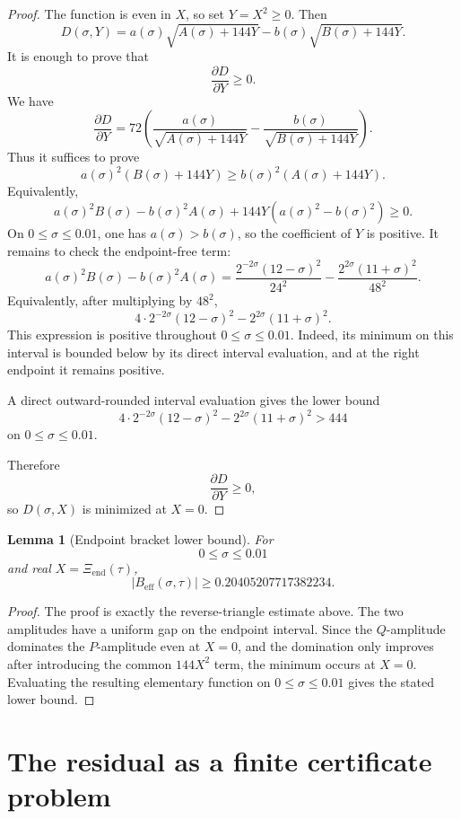 \documentclass[11pt]{article}
\newtheorem{lemma}[theorem]{Lemma}
\newcommand{\Beff}{B_{\mathrm{eff}}}
\begin{document}
\begin{proof}
The function is even in \(X\), so set \(Y=X^2\ge0\).  Then
\[
D(\sigma,Y)
=
a(\sigma)\sqrt{A(\sigma)+144Y}
-
b(\sigma)\sqrt{B(\sigma)+144Y}.
\]
It is enough to prove that
\[
\frac{\partial D}{\partial Y}\ge0.
\]
We have
\[
\frac{\partial D}{\partial Y}
=
72\left(
\frac{a(\sigma)}{\sqrt{A(\sigma)+144Y}}
-
\frac{b(\sigma)}{\sqrt{B(\sigma)+144Y}}
\right).
\]
Thus it suffices to prove
\[
a(\sigma)^2(B(\sigma)+144Y)
\ge
b(\sigma)^2(A(\sigma)+144Y).
\]
Equivalently,
\[
a(\sigma)^2B(\sigma)-b(\sigma)^2A(\sigma)
+
144Y(a(\sigma)^2-b(\sigma)^2)
\ge0.
\]
On \(0\le\sigma\le0.01\), one has \(a(\sigma)>b(\sigma)\), so the
coefficient of \(Y\) is positive.  It remains to check the endpoint-free term:
\[
a(\sigma)^2B(\sigma)-b(\sigma)^2A(\sigma)
=
\frac{2^{-2\sigma}(12-\sigma)^2}{24^2}
-
\frac{2^{2\sigma}(11+\sigma)^2}{48^2}.
\]
Equivalently, after multiplying by \(48^2\),
\[
4\cdot 2^{-2\sigma}(12-\sigma)^2
-
2^{2\sigma}(11+\sigma)^2.
\]
This expression is positive throughout \(0\le\sigma\le0.01\).  Indeed, its
minimum on this interval is bounded below by its direct interval evaluation,
and at the right endpoint it remains positive.  

A direct outward-rounded interval evaluation gives the lower bound
\[
4\cdot 2^{-2\sigma}(12-\sigma)^2
-
2^{2\sigma}(11+\sigma)^2
>
444
\]
on \(0\le\sigma\le0.01\).

Therefore
\[
\frac{\partial D}{\partial Y}\ge0,
\]
so \(D(\sigma,X)\) is minimized at \(X=0\).
\end{proof}

\begin{lemma}[Endpoint bracket lower bound]
For
\[
0\leq \sigma\leq0.01
\]
and real \(X=\Xi_{\mathrm{end}}(\tau)\),
\[
|\Beff(\sigma,\tau)|\geq 0.20405207717382234.
\]
\end{lemma}

\begin{proof}
The proof is exactly the reverse-triangle estimate above.  The two amplitudes have a uniform gap on the endpoint interval.  Since the \(Q\)-amplitude dominates the \(P\)-amplitude even at \(X=0\), and the domination only improves after introducing the common \(144X^2\) term, the minimum occurs at \(X=0\).  Evaluating the resulting elementary function on \(0\leq\sigma\leq0.01\) gives the stated lower bound.
\end{proof}



\section{The residual as a finite certificate problem}
\end{document}
